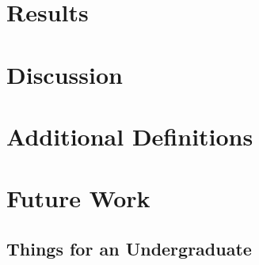 \documentclass[twoside]{mtu.thesis}
\begin{document}
\chapter{Results}
\lipsum[1-20]

\chapter{Discussion}
\lipsum[1-20]

\nocite{*}


\appendix

\chapter{Additional Definitions}
\lipsum[1-20]

\chapter{Future Work}
\lipsum[1-5]
\section{Things for an Undergraduate}
\lipsum[1-10]
\end{document}
